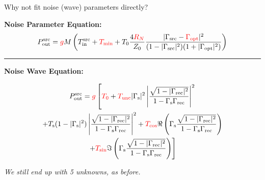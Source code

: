 \documentclass[aspectratio=169]{beamer}
\begin{document}
\begin{frame}{\small{Why not fit noise (wave) parameters directly?}}

	\textbf{\small{Noise Parameter Equation:}}
	{\tiny
		\begin{equation}
			P_{\text{out}}^{\text{src}} = \textcolor{red}{g} M \left( T_{\text{in}}^{\text{src}} + \textcolor{red}{T_{\text{min}}} + T_0 \frac{4\textcolor{red}{R_N}}{Z_0} \frac{|\Gamma_{\text{src}} - \textcolor{red}{\Gamma_{\text{opt}}}|^2}{(1 - |\Gamma_{\text{src}}|^2)(1 + |\Gamma_{\text{opt}}|^2)} \right)
		\end{equation}
	}

	\vspace{0.05cm}
	\hrule  %
	\vspace{0.05cm}

	\textbf{\small{Noise Wave Equation:}}

	{\tiny
		\begin{multline}\label{}
			P_{\text{out}}^{\text{src}} = \textcolor{red}{g} \left[ \textcolor{red}{T_0} + \textcolor{red}{T_{\text{unc}}} |\Gamma_{\text{s}}|^2 \left|\frac{ \sqrt{1 - |\Gamma_{\text{rec}}|^2}}{1 - \Gamma_{\text{s}}\Gamma_{\text{rec}}} \right|^2 \right. \\
				\left. + T_{\text{s}}(1 - |\Gamma_{\text{s}}|^2) \left|\frac{ \sqrt{1 - |\Gamma_{\text{rec}}|^2}}{1 - \Gamma_{\text{s}}\Gamma_{\text{rec}}} \right|^2 + \textcolor{red}{T_{\text{cos}}} \Re \left( \Gamma_{\text{s}} \frac{\sqrt{1 - |\Gamma_{\text{rec}}|^2}}{1 - \Gamma_{\text{s}} \Gamma_{\text{rec}}} \right) \right. \\
				\left. + \textcolor{red}{T_{\text{sin}}} \Im \left( \Gamma_{\text{s}} \frac{\sqrt{1 - |\Gamma_{\text{rec}}|^2}}{1 - \Gamma_{\text{s}} \Gamma_{\text{rec}}} \right) \right]
		\end{multline}
	}

	\textit{We still end up with 5 unknowns, as before.}

\end{frame}
\end{document}

